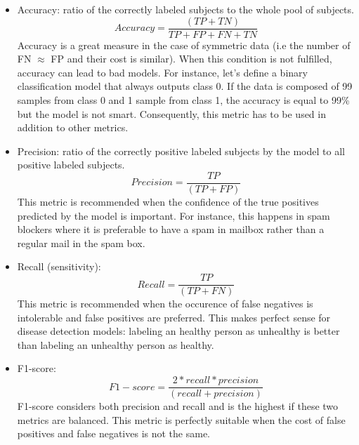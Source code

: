 \begin{itemize}
\item Accuracy: ratio of the correctly labeled subjects to the whole pool of subjects.
\begin{equation}
Accuracy = \frac{(TP+TN)}{TP+FP+FN+TN}
\end{equation}
Accuracy is a great measure in the case of symmetric data (i.e the number of FN $\approx$ FP and their cost is similar). When this condition is not fulfilled, accuracy can lead to bad models. For instance, let's define a binary classification model that always outputs class 0. If the data is composed of 99 samples from class 0 and 1 sample from class 1, the accuracy is equal to 99\% but the model is not smart. Consequently, this metric has to be used in addition to other metrics.

\item Precision: ratio of the correctly positive labeled subjects by the model to all positive labeled subjects.
\begin{equation}
Precision = \frac{TP}{(TP + FP)}
\end{equation}
This metric is recommended when the confidence of the true positives predicted by the model is important. For instance, this happens in spam blockers where it is preferable to have a spam in mailbox rather than a regular mail in the spam box.

\item Recall (sensitivity):
\begin{equation}
Recall = \frac{TP}{(TP + FN)}
\end{equation}
This metric is recommended when the occurence of false negatives is intolerable and false positives are preferred. This makes perfect sense for disease detection models: labeling an healthy person as unhealthy is better than labeling an unhealthy person as healthy.

\item F1-score:
\begin{equation}
F1-score = \frac{2* recall * precision}{(recall + precision)}
\end{equation}
F1-score considers both precision and recall and is the highest if these two metrics are balanced. This metric is perfectly suitable when the cost of false positives and false negatives is not the same.


\end{itemize}
